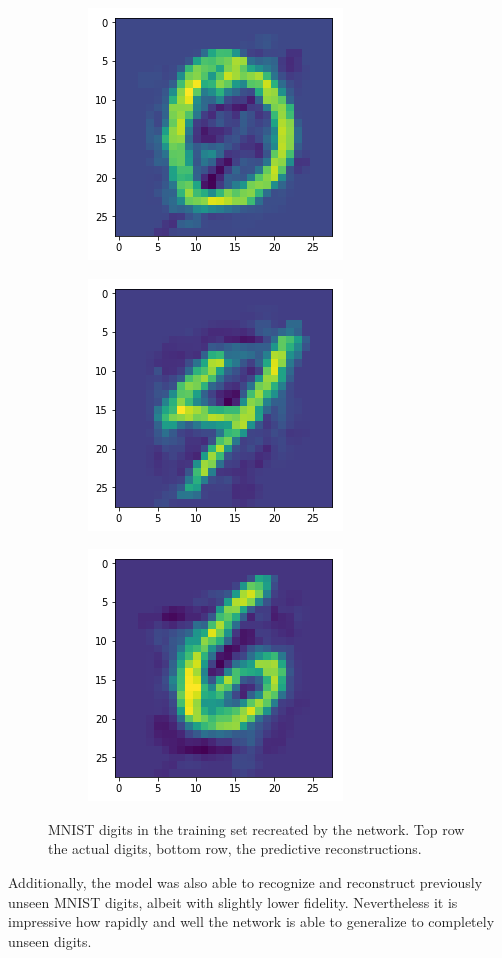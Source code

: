 \begin{figure}[H]
\bigskip
\begin{subfigure}{.3\linewidth}
 \centering
 \includegraphics[scale=0.4]{chapter_3_figures/mnist_test_0.png}
\end{subfigure}
 \hfill
\begin{subfigure}{.3\linewidth}
 \centering
 \includegraphics[scale=0.4]{chapter_3_figures/mnist_test_4.png}
\end{subfigure}
 \hfill
\begin{subfigure}{.3\linewidth}
 \centering
 \includegraphics[scale=0.4]{chapter_3_figures/mnist_test_6.png}
\end{subfigure}
\caption{MNIST digits in the training set recreated by the network. Top row the actual digits, bottom row, the predictive reconstructions.}
\end{figure}
Additionally, the model was also able to recognize and reconstruct previously unseen MNIST digits, albeit with slightly lower fidelity. Nevertheless it is impressive how rapidly and well the network is able to generalize to completely unseen digits.
\newline
\bigskip

